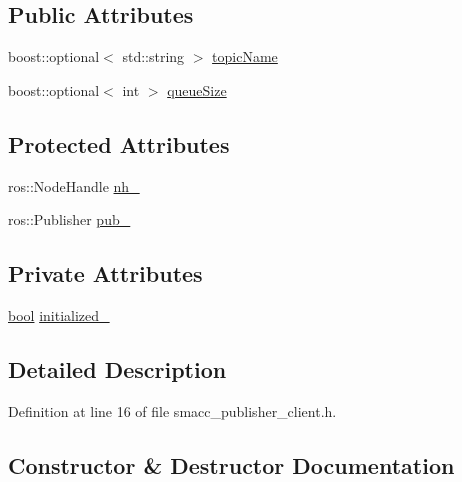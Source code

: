 \subsection*{Public Attributes}
\begin{DoxyCompactItemize}
\item 
boost\+::optional$<$ std\+::string $>$ \hyperlink{classsmacc_1_1client__bases_1_1SmaccPublisherClient_a8b8d98aef9b3b3a441005d2cb17b4fcc}{topic\+Name}
\item 
boost\+::optional$<$ int $>$ \hyperlink{classsmacc_1_1client__bases_1_1SmaccPublisherClient_a1a9b98681b01953f134191799a029fd3}{queue\+Size}
\end{DoxyCompactItemize}
\subsection*{Protected Attributes}
\begin{DoxyCompactItemize}
\item 
ros\+::\+Node\+Handle \hyperlink{classsmacc_1_1client__bases_1_1SmaccPublisherClient_a83a44b5a1afd4d45140d4936f4011cc9}{nh\+\_\+}
\item 
ros\+::\+Publisher \hyperlink{classsmacc_1_1client__bases_1_1SmaccPublisherClient_af39f498e73e8f956aae312065a4fd093}{pub\+\_\+}
\end{DoxyCompactItemize}
\subsection*{Private Attributes}
\begin{DoxyCompactItemize}
\item 
\hyperlink{classbool}{bool} \hyperlink{classsmacc_1_1client__bases_1_1SmaccPublisherClient_acb2fbd8b9797ce286d9ecc0419e2cc55}{initialized\+\_\+}
\end{DoxyCompactItemize}


\subsection{Detailed Description}


Definition at line 16 of file smacc\+\_\+publisher\+\_\+client.\+h.



\subsection{Constructor \& Destructor Documentation}
